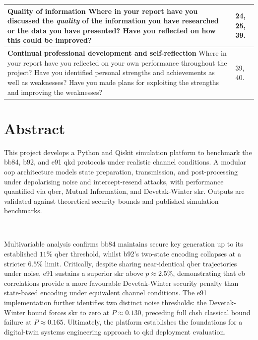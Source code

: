 \documentclass[11pt, a4paper]{report}
\begin{document}
\begin{tabular}{|p{}|p{}|}
\hline
\textbf{Quality of information} Where in your report have you discussed the \textit{quality} of the information you have researched or the data you have presented? Have you reflected on how this could be improved? & 24, 25, 39. \\
\hline
\textbf{Continual professional development and self-reflection} Where in your report have you reflected on your own performance throughout the project? Have you identified personal strengths and achievements as well as weaknesses? Have you made plans for exploiting the strengths and improving the weaknesses? & 39, 40. \\
\hline
\end{tabular}




\clearpage
\chapter*{Abstract}

{\fontsize{9}{10}\selectfont\bfseries

This project develops a Python and Qiskit simulation platform to benchmark the \gls{bb84}, \gls{b92}, and \gls{e91} \gls{qkd} protocols under realistic channel conditions. A modular \gls{oop} architecture models state preparation, transmission, and post-processing under depolarising noise and intercept-resend attacks, with performance quantified via \gls{qber}, Mutual Information, and Devetak-Winter \gls{skr}. Outputs are validated against theoretical security bounds and published simulation benchmarks.

\ 

Multivariable analysis confirms \gls{bb84} maintains secure key generation up to its established $11\%$ \gls{qber} threshold, whilst \gls{b92}'s two-state encoding collapses at a stricter $6.5\%$ limit. Critically, despite sharing near-identical \gls{qber} trajectories under noise, \gls{e91} sustains a superior \gls{skr} above $p \approx 2.5\%$, demonstrating that \gls{eb} correlations provide a more favourable Devetak-Winter security penalty than state-based encoding under equivalent channel conditions. The \gls{e91} implementation further identifies two distinct noise thresholds: the Devetak-Winter bound forces \gls{skr} to zero at $P \approx 0.130$, preceding full \gls{chsh} classical bound failure at $P \approx 0.165$. Ultimately, the platform establishes the foundations for a digital-twin systems engineering approach to \gls{qkd} deployment evaluation.


\par
}
\end{document}
